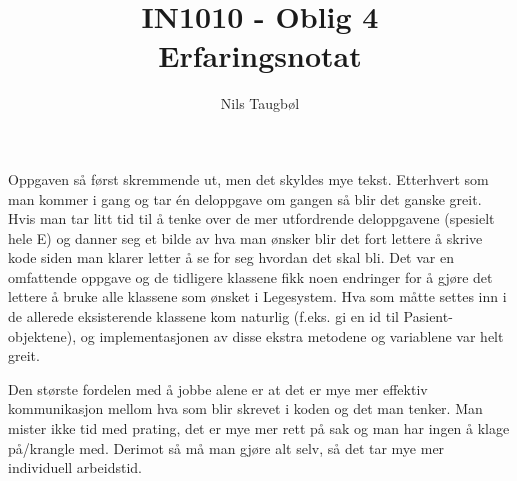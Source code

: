 \documentclass[a4paper,10pt]{article}
\title{IN1010 - Oblig 4 \\ Erfaringsnotat}
\author{Nils Taugbøl}
\begin{document}
\maketitle

Oppgaven så først skremmende ut, men det skyldes mye tekst.
Etterhvert som man kommer i gang og tar én deloppgave om gangen så blir det ganske greit.
Hvis man tar litt tid til å tenke over de mer utfordrende deloppgavene (spesielt hele E)
og danner seg et bilde av hva man ønsker blir det fort lettere å skrive kode siden man klarer letter å se for seg hvordan det skal bli.
Det var en omfattende oppgave og de tidligere klassene fikk noen endringer for å gjøre det lettere å bruke alle klassene som ønsket i Legesystem.
Hva som måtte settes inn i de allerede eksisterende klassene kom naturlig (f.eks. gi en id til Pasient-objektene), og implementasjonen av disse ekstra metodene og variablene var helt greit.

Den største fordelen med å jobbe alene er at det er mye mer effektiv kommunikasjon mellom hva som blir skrevet i koden og det man tenker.
Man mister ikke tid med prating, det er mye mer rett på sak og man har ingen å klage på/krangle med.
Derimot så må man gjøre alt selv, så det tar mye mer individuell arbeidstid.
\end{document}
